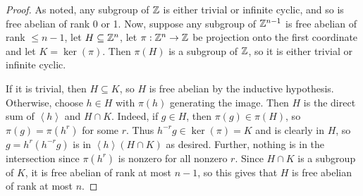 \begin{proof} 
    As noted, any subgroup of $\mathbb{Z}$ is either trivial or infinite cyclic, and so is free abelian of rank 0 or 1. Now, suppose any subgroup of $\mathbb{Z}^{n-1}$ is free abelian of rank $\leq n-1$, let $H \subseteq \mathbb{Z}^n$, let $\pi : \mathbb{Z}^n \to \mathbb{Z}$ be projection onto the first coordinate and let $K = \ker(\pi)$. Then $\pi(H)$ is a subgroup of $\mathbb{Z}$, so it is either trivial or infinite cyclic.

    If it is trivial, then $H \subseteq K$, so $H$ is free abelian by the inductive hypothesis. Otherwise, choose $h \in H$ with $\pi(h)$ generating the image. Then $H$ is the direct sum of $\left<h\right>$ and $H \cap K$. Indeed, if $g \in H$, then $\pi(g) \in \pi(H)$, so $\pi(g) = \pi(h^r)$ for some $r$. Thus $h^{-r}g \in \ker(\pi) = K$ and is clearly in $H$, so $g = h^r(h^{-r}g)$ is in $\left<h\right>(H \cap K)$ as desired. Further, nothing is in the intersection since $\pi(h^r)$ is nonzero for all nonzero $r$. Since $H \cap K$ is a subgroup of $K$, it is free abelian of rank at most $n-1$, so this gives that $H$ is free abelian of rank at most $n$.
\end{proof}
